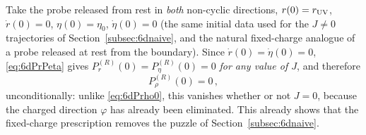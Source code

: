 \documentclass[11pt]{article}
\begin{document}
Take the probe released from rest in \emph{both} non-cyclic directions, $r(0)=r_{\rm UV}$, $\dot r(0)=0$, $\eta(0)=\eta_0$, $\dot\eta(0)=0$ (the same initial data used for the $J\neq0$ trajectories of Section~\ref{subsec:6dnaive}, and the natural fixed-charge analogue of a probe released at rest from the boundary). Since $\dot r(0)=\dot\eta(0)=0$, \eqref{eq:6dPrPeta} gives $P_r^{(R)}(0)=P_\eta^{(R)}(0)=0$ \emph{for any value of $J$}, and therefore
\begin{equation}
P_\rho^{(R)}(0)=0\,,
\end{equation}
unconditionally: unlike \eqref{eq:6dPrho0}, this vanishes whether or not $J=0$, because the charged direction $\varphi$ has already been eliminated. This already shows that the fixed-charge prescription removes the puzzle of Section~\ref{subsec:6dnaive}.
\end{document}
